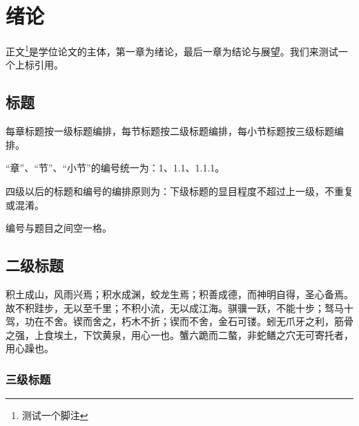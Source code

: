 % 
%
%
% 
%
\chapter{绪论}

正文\footnote{测试一个脚注}是学位论文的主体，第一章为绪论，最后一章为结论与展望。我们来测试一个上标引用\cite{niubi-paper}。
    
    \section{标题}

    每章标题按一级标题编排，每节标题按二级标题编排，每小节标题按三级标题编排。

    “章”、“节”、“小节”的编号统一为：1、1.1、1.1.1。

    四级以后的标题和编号的编排原则为：下级标题的显目程度不超过上一级，不重复或混淆。

    编号与题目之间空一格。

    \section{二级标题}

        积土成山，风雨兴焉；积水成渊，蛟龙生焉；积善成德，而神明自得，圣心备焉。故不积跬步，无以至千里；不积小流，无以成江海。骐骥一跃，不能十步；驽马十驾，功在不舍。锲而舍之，朽木不折；锲而不舍，金石可镂。蚓无爪牙之利，筋骨之强，上食埃土，下饮黄泉，用心一也。蟹六跪而二螯，非蛇鳝之穴无可寄托者，用心躁也。 

        \subsection{三级标题}


